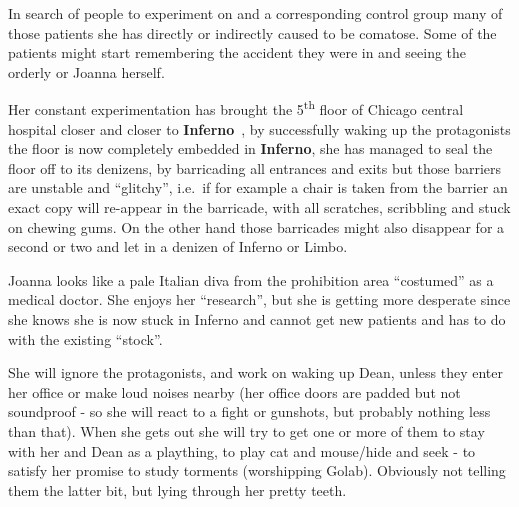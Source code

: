 \documentclass[bg-full]{resources/stylesheets/kult}
\begin{document}
In search of people to experiment on and a corresponding control group many of those patients she has directly or indirectly
caused to be comatose.  Some of the patients might start remembering the accident they were in and seeing the orderly or Joanna
herself.

Her constant experimentation has brought the 5\textsuperscript{th} floor of Chicago central hospital closer and closer to
\textbf{Inferno}~\cite[p.~314]{KULT:core}, by successfully waking up the protagonists the floor is now completely embedded in
\textbf{Inferno}, she has managed to seal the floor off to its denizens, by barricading all entrances and exits but those
barriers are unstable and “glitchy”, i.e.~if for example a chair is taken from the barrier an exact copy will re-appear in the
barricade, with all scratches, scribbling and stuck on chewing gums.  On the other hand those barricades might also disappear
for a second or two and let in a denizen of Inferno or Limbo.

Joanna looks like a pale Italian diva from the prohibition area “costumed” as a medical doctor.  She enjoys her “research”, but
she is getting more desperate since she knows she is now stuck in Inferno and cannot get new patients and has to do with the
existing “stock”.

She will ignore the protagonists, and work on waking up Dean, unless they enter her office or make loud noises nearby (her office
doors are padded but not soundproof - so she will react to a fight or gunshots, but probably nothing less than that). When she
gets out she will try to get one or more of them to stay with her and Dean as a plaything, to play cat and mouse/hide and seek -
to satisfy her promise to study torments (worshipping Golab). Obviously not telling them the latter bit, but lying through her
pretty teeth.

\end{document}

